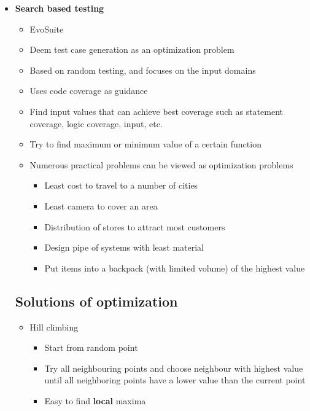 \documentclass[12pt]{book}
\begin{document}
\begin{itemize}
\begin{itemize}
    \end{itemize}

    \item \textbf{Search based testing}
    \begin{itemize}
        \item EvoSuite
        \item Deem test case generation as an optimization problem
        \item Based on random testing, and focuses on the input domains
        \item Uses code coverage as guidance
        \item Find input values that can achieve best coverage such as statement coverage, logic coverage, input, etc.
        \item Try to find maximum or minimum value of a certain function
        \item Numerous practical problems can be viewed as optimization problems
        \begin{itemize}
            \item Least cost to travel to a number of cities
            \item Least camera to cover an area
            \item Distribution of stores to attract most customers
            \item Design pipe of systems with least material
            \item Put items into a backpack (with limited volume) of the highest value
        \end{itemize}
    \end{itemize}

    \subsection*{Solutions of optimization}
    \begin{itemize}
        \item Hill climbing
        \begin{itemize}
            \item Start from random point
            \item Try all neighbouring points and choose neighbour with highest value until all neighboring points have a lower value than the current point
            \item Easy to find \textbf{local} maxima
        \end{itemize} 


\end{itemize}
\end{itemize}
\end{document}
